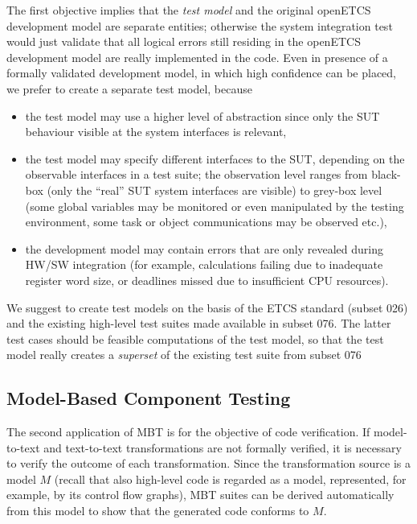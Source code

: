 \documentclass[11pt, a4paper]{article}
\begin{document}
The first objective implies that the {\it test model} and the original openETCS development model are
separate entities; otherwise the system integration test would just validate that all logical
errors still residing in the openETCS development model are really implemented in the code. Even in presence
of a formally validated development model, in which high confidence can be placed, we prefer to create a 
separate test model, because
\begin{itemize}
\item the test model may use a higher level of abstraction since only the SUT behaviour visible at the 
system interfaces is relevant,

\item the test model may specify different interfaces to the SUT, depending on the observable interfaces
in a test suite; the observation level ranges from black-box (only the ``real'' SUT system interfaces
are visible) to grey-box level (some global variables may be monitored or even manipulated by the testing environment, some task or object communications may be observed etc.),  

\item the development model may contain errors that are only revealed during HW/SW integration (for example, calculations failing due to inadequate register word size, or deadlines missed due to insufficient CPU resources).
\end{itemize}

We suggest to create test models on the basis of the ETCS standard (subset 026) and
the existing high-level test suites made available in subset 076. The latter test cases should 
be feasible computations of the test model, so that the test model really creates a {\it superset}
of the existing test suite from subset 076


\subsection{Model-Based Component Testing}\label{sec:comptest}

The second application of MBT is for the objective of code verification.
If model-to-text and text-to-text transformations are not formally verified, it
is necessary to verify the outcome of each transformation. Since the transformation
source is a model $M$ (recall that also high-level code is regarded as a model, represented, for example, by its control flow graphs), MBT suites can be derived automatically from this model to show that the
generated code conforms to $M$. 
\end{document}
